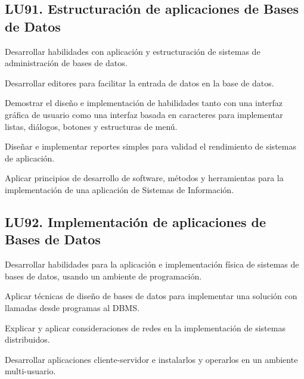 \subsection{LU91. Estructuración de aplicaciones de Bases de Datos}\label{sec:BOK-LU91}\label{sec:LU91}
\begin{LearningUnit}
\begin{LUGoal}
\item Desarrollar habilidades con aplicación y estructuración de sistemas de administración de  bases de datos.
\end{LUGoal}

\begin{LUObjective}
\item Desarrollar editores para facilitar la entrada de datos en la base de datos.
\item Demostrar el diseño e implementación de habilidades tanto con una interfaz gráfica de usuario como una interfaz basada en caracteres para implementar listas, diálogos, botones y estructuras de menú.
\item Diseñar e implementar reportes simples para validad el rendimiento de sistemas de aplicación.
\item Aplicar principios de desarrollo de software, métodos y herramientas para la implementación de una aplicación de Sistemas de Información.
\end{LUObjective}
\end{LearningUnit}

\subsection{LU92. Implementación de aplicaciones de Bases de Datos}\label{sec:BOK-LU92}\label{sec:LU92}
\begin{LearningUnit}
\begin{LUGoal}
\item Desarrollar habilidades para la aplicación e implementación física de sistemas de bases de datos, usando un ambiente de programación.
\end{LUGoal}

\begin{LUObjective}
\item Aplicar técnicas de diseño de bases de datos para implementar una solución con llamadas desde programas al DBMS.
\item Explicar y aplicar consideraciones de redes en la implementación de sistemas distribuidos.
\item Desarrollar aplicaciones cliente-servidor e instalarlos y operarlos en un ambiente multi-usuario.
\end{LUObjective}
\end{LearningUnit}

